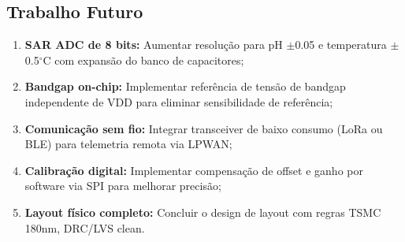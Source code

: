 \documentclass[12pt,a4paper]{article}
\begin{document}
\subsection{Trabalho Futuro}

\begin{enumerate}
  \item \textbf{SAR ADC de 8 bits:} Aumentar resolução para pH $\pm$0.05 e
        temperatura $\pm$0.5$^\circ$C com expansão do banco de capacitores;
  \item \textbf{Bandgap on-chip:} Implementar referência de tensão de bandgap
        independente de VDD para eliminar sensibilidade de referência;
  \item \textbf{Comunicação sem fio:} Integrar transceiver de baixo consumo
        (LoRa ou BLE) para telemetria remota via LPWAN;
  \item \textbf{Calibração digital:} Implementar compensação de offset e ganho
        por software via SPI para melhorar precisão;
  \item \textbf{Layout físico completo:} Concluir o design de layout com regras
        TSMC 180nm, DRC/LVS clean.
\end{enumerate}

\newpage
\end{document}
